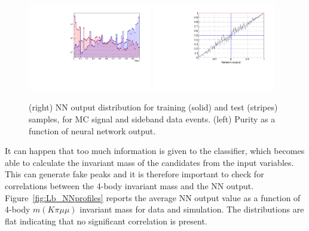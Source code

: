 \begin{figure}
\centering
\includegraphics[width=0.48\textwidth]{Lmumu/figs/TrainAndTest.pdf}
\includegraphics[width=0.48\textwidth]{Lmumu/figs/purity_NN.pdf}
\caption{(right) NN output distribution for training (solid) and test (stripes) samples,
for MC signal and sideband data events. (left) Purity as a function of neural network output.}
\label{fig:Lb_nnDist}
\end{figure}


It can happen that too much information is given to the classifier, which becomes able to 
calculate the invariant mass of the candidates from the input variables.
This can generate fake peaks and it is therefore important to check
for correlations between the 4-body invariant mass and the NN output.
Figure~\ref{fig:Lb_NNprofiles} reports the average NN output value as a function of
4-body $m(K\pi\mu\mu)$ invariant mass for data and simulation. The distributions
are flat indicating that no significant correlation is present.

